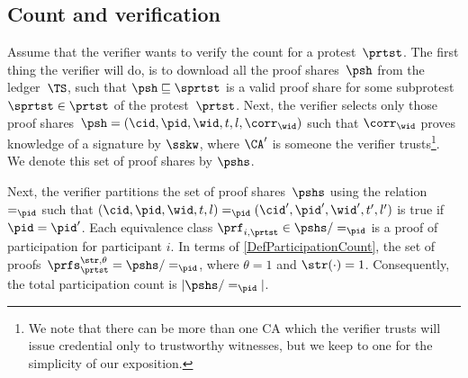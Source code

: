 \subsection{Count and verification}%
\label{ProtocolVerification}


Assume that the verifier wants to verify the count for a protest~\(\prtst\).
The first thing the verifier will do, is to download all the proof 
shares~\(\psh\) from the ledger~\(\TS\), such that \(\psh \sqsubseteq \sprtst\) 
is a valid proof share for some subprotest~\(\sprtst\in\prtst\) of the 
protest~\(\prtst\).
Next, the verifier selects only those proof shares~\(\psh = (\cid, \pid, \wid, 
t, l, \corr_{\wid})\) such that \(\corr_\wid\) proves knowledge of a signature 
by \(\sskw\), where \(\CA'\) is someone the verifier trusts\footnote{%
  We note that there can be more than one \ac{CA} which the verifier trusts 
  will issue credential only to trustworthy witnesses,
  but we keep to one for the simplicity of our exposition.
}.
We denote this set of proof shares by \(\pshs\).

Next, the verifier partitions the set of proof shares~\(\pshs\) using the 
relation~\(=_\pid\) such that \(
  (\cid, \pid, \wid, t, l) =_\pid (\cid', \pid', \wid', t', l')
\) is true if \(\pid = \pid'\).
Each equivalence class \(\prf_{i, \prtst} \in \pshs/=_\pid\) is a proof of 
participation for participant \(i\).
In terms of \cref{DefParticipationCount}, the set of 
proofs~\(\prfs_\prtst^{\str, \theta} = \pshs/=_\pid\), where \(\theta = 1\) and 
\(\str(\cdot) = 1\).
Consequently, the total participation count is \(|\pshs/=_\pid|\).


